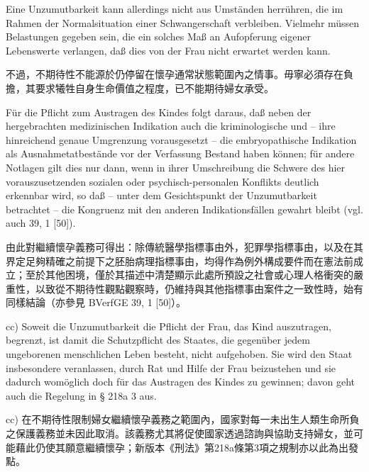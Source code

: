 \documentclass[12pt]{article}
\begin{document}
\begin{sourcepara}[title={原文D.51}]
Eine Unzumutbarkeit kann allerdings nicht aus Umständen herrühren, die im Rahmen der Normalsituation einer Schwangerschaft verbleiben. Vielmehr müssen Belastungen gegeben sein, die ein solches Maß an Aufopferung eigener Lebenswerte verlangen, daß dies von der Frau nicht erwartet werden kann.
\end{sourcepara}
\begin{transpara}
不過，不期待性不能源於仍停留在懷孕通常狀態範圍內之情事。毋寧必須存在負擔，其要求犧牲自身生命價值之程度，已不能期待婦女承受。
\end{transpara}

\begin{sourcepara}[title={原文D.52}]
Für die Pflicht zum Austragen des Kindes folgt daraus, daß neben der hergebrachten medizinischen Indikation auch die kriminologische und -- ihre hinreichend genaue Umgrenzung vorausgesetzt -- die embryopathische Indikation als Ausnahmetatbestände vor der Verfassung Bestand haben können; für andere Notlagen gilt dies nur dann, wenn in ihrer Umschreibung die Schwere des hier vorauszusetzenden sozialen oder psychisch-personalen Konflikts deutlich erkennbar wird, so daß -- unter dem Gesichtspunkt der Unzumutbarkeit betrachtet -- die Kongruenz mit den anderen Indikationsfällen gewahrt bleibt (vgl. auch \abbrBVerfGE{} 39, 1 [50]).
\end{sourcepara}
\begin{transpara}
由此對繼續懷孕義務可得出：除傳統醫學指標事由外，犯罪學指標事由，以及在其界定足夠精確之前提下之胚胎病理指標事由，均得作為例外構成要件而在憲法前成立；至於其他困境，僅於其描述中清楚顯示此處所預設之社會或心理人格衝突的嚴重性，以致從不期待性觀點觀察時，仍維持與其他指標事由案件之一致性時，始有同樣結論（亦參見 BVerfGE 39, 1 [50]）。
\end{transpara}

\begin{sourcepara}[title={原文D.53}]
cc) Soweit die Unzumutbarkeit die Pflicht der Frau, das Kind auszutragen, begrenzt, ist damit die Schutzpflicht des Staates, die gegenüber jedem ungeborenen menschlichen Leben besteht, nicht aufgehoben. Sie wird den Staat insbesondere veranlassen, durch Rat und Hilfe der Frau beizustehen und sie dadurch womöglich doch für das Austragen des Kindes zu gewinnen; davon geht auch die Regelung in § 218a \abbrAbs{} 3 \abbrStGB{} \abbrNF{} aus.
\end{sourcepara}
\begin{transpara}
cc) 在不期待性限制婦女繼續懷孕義務之範圍內，國家對每一未出生人類生命所負之保護義務並未因此取消。該義務尤其將促使國家透過諮詢與協助支持婦女，並可能藉此仍使其願意繼續懷孕；新版本《刑法》第218a條第3項之規制亦以此為出發點。
\end{transpara}
\end{document}
